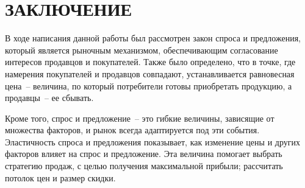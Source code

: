 \chapter*{\hfill{\centering  ЗАКЛЮЧЕНИЕ}\hfill}

В ходе написания данной работы был рассмотрен закон спроса и предложения, который является рыночным механизмом, обеспечивающим согласование интересов продавцов и покупателей.
Также было определено, что в точке, где намерения покупателей и продавцов совпадают, устанавливается равновесная цена~-- величина, по который потребители готовы приобретать продукцию, а продавцы~-- ее сбывать.

Кроме того, спрос и предложение~-- это гибкие величины, зависящие от множества факторов, и рынок всегда адаптируется под эти события. 
Эластичность спроса и предложения показывает, как изменение цены и других факторов влияет на спрос и предложение.
Эта величина помогает выбрать стратегию продаж, с целью получения максимальной прибыли; рассчитать потолок цен и размер скидки.